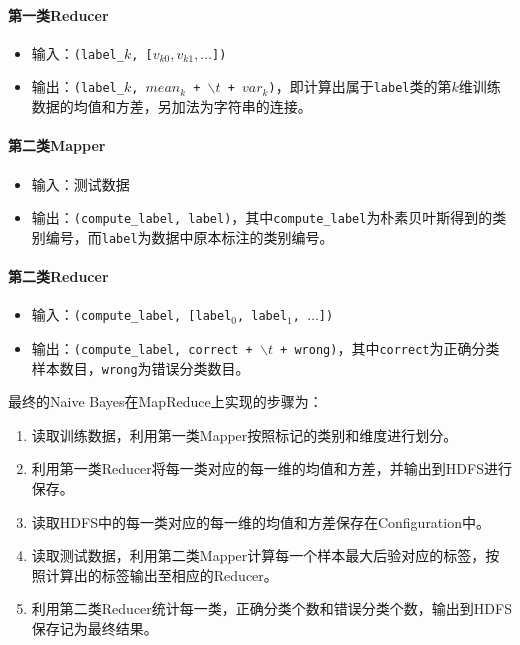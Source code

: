 \documentclass{ML}
\begin{document}
\paragraph{第一类Reducer}
\begin{itemize}
    \item 输入：\texttt{(label\_$k$, [$v_{k0}, v_{k1}, \dots$])}
    \item 输出：\texttt{(label\_$k$, $mean_k$ + $\backslash t$ + $var_k$)}，即计算出属于\texttt{label}类的第$k$维训练数据的均值和方差，另加法为字符串的连接。
\end{itemize}
\paragraph{第二类Mapper}
\begin{itemize}
    \item 输入：测试数据
    \item 输出：\texttt{(compute\_label, label)}，其中\texttt{compute\_label}为朴素贝叶斯得到的类别编号，而\texttt{label}为数据中原本标注的类别编号。
\end{itemize}
\paragraph{第二类Reducer}
\begin{itemize}
    \item 输入：\texttt{(compute\_label, [label$_0$, label$_1$, $\dots$])}
    \item 输出：\texttt{(compute\_label, correct + $\backslash t$ + wrong)}，其中\texttt{correct}为正确分类样本数目，\texttt{wrong}为错误分类数目。
\end{itemize}

最终的Naive Bayes在MapReduce上实现的步骤为：
\begin{enumerate}
    \item 读取训练数据，利用第一类Mapper按照标记的类别和维度进行划分。
    \item 利用第一类Reducer将每一类对应的每一维的均值和方差，并输出到HDFS进行保存。
    \item 读取HDFS中的每一类对应的每一维的均值和方差保存在Configuration中。
    \item 读取测试数据，利用第二类Mapper计算每一个样本最大后验对应的标签，按照计算出的标签输出至相应的Reducer。
    \item 利用第二类Reducer统计每一类，正确分类个数和错误分类个数，输出到HDFS保存记为最终结果。
\end{enumerate}
\end{document}
